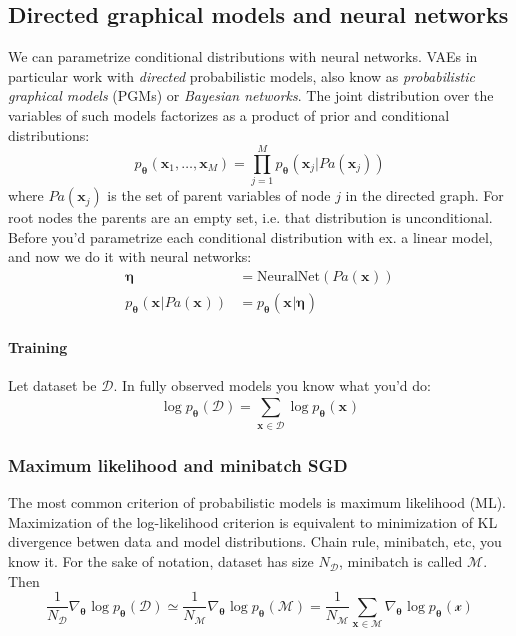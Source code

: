 \documentclass{article}
\begin{document}
\subsection{Directed graphical models and neural networks}
We can parametrize conditional distributions with neural networks.
VAEs in particular work with \textit{directed} probabilistic models,
also know as \textit{probabilistic graphical models} (PGMs)
or \textit{Bayesian networks}.
The joint distribution over the variables of such models
factorizes as a product of prior and conditional distributions:
\begin{equation}
p_{ \bm{\theta}_{} } (\bm{x}_{1}, \dots, \bm{x}_{M}) =
\prod_{j=1}^{M} p_{ \bm{\theta}_{} } (\bm{x}_{j}| Pa (\bm{x}_{j})) 
\end{equation}
where $ P a (\bm{x}_{j})  $ is the set of parent variables of node $ j  $ in
the directed graph. For root nodes the parents are an empty set,
i.e. that distribution is unconditional.
Before you'd parametrize each conditional distribution with
ex. a linear model, and now we do it with neural networks:
\begin{align}
		\bm{\eta}_{} &= \text{NeuralNet} (P a (\bm{x}_{}))\\
		p_{ \bm{\theta}_{} } (\bm{x}_{}|Pa (\bm{x}_{})) &= p_{ \bm{\theta}_{} } (\bm{x}_{}|\bm{\eta}_{})
\end{align}

\paragraph{Training}
Let dataset be $ \mathcal{D}  $.
In fully observed models you know what you'd do:
\begin{equation}
		\log p_{ \bm{\theta}_{} } (\mathcal{D}) = \sum_{\bm{x}_{} \in \mathcal{D}}^{} 
		\log p_{ \bm{\theta}_{} } (\bm{x}_{})
\end{equation}

\subsubsection{Maximum likelihood and minibatch SGD}
The most common criterion of probabilistic models
is maximum likelihood (ML).
Maximization of the log-likelihood criterion is equivalent to minimization
of KL divergence betwen data and model distributions.
Chain rule, minibatch, etc, you know it.
For the sake of notation, dataset has size $ N_{ \mathcal{D} }  $,
minibatch is called $ \mathcal{M}  $. Then
\begin{equation}
\frac{1}{N_{ \mathcal{D} }} \nabla_{ \bm{\theta}_{} }\log p_{ \bm{\theta}_{} } (\mathcal{D}) \simeq
\frac{1}{N_{ \mathcal{M} }} \nabla_{ \bm{\theta}_{} }\log p_{ \bm{\theta}_{} } (\mathcal{M})  =
\frac{1}{N_{ \mathcal{M} }} \sum_{\bm{x}_{}\in \mathcal{M}}^{} \nabla_{ \bm{\theta}_{} }\log p_{ \bm{\theta}_{} } (\mathcal{x})  
\end{equation}
\end{document}
